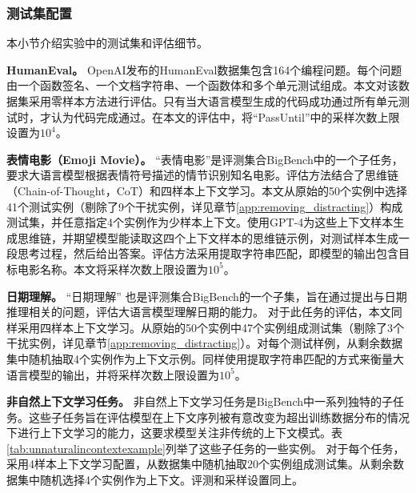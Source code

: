\subsubsection{测试集配置}
\label{app:testset}
本小节介绍实验中的测试集和评估细节。

\textbf{HumanEval。}
\label{app:humaneval}
OpenAI发布的HumanEval\citep{chen2021evaluating}数据集包含164个编程问题。每个问题由一个函数签名、一个文档字符串、一个函数体和多个单元测试组成。本文对该数据集采用零样本方法进行评估。只有当大语言模型生成的代码成功通过所有单元测试时，才认为代码完成通过。在本文的评估中，将“PassUntil”中的采样次数上限设置为\(10^4\)。

\textbf{表情电影（Emoji Movie）。}
\label{app:emoji_movies}
“表情电影”是评测集合BigBench\citep{srivastava2022beyond}中的一个子任务，要求大语言模型根据表情符号描述的情节识别知名电影。评估方法结合了思维链（Chain-of-Thought，CoT）和四样本上下文学习。本文从原始的50个实例中选择41个测试实例（剔除了9个干扰实例，详见章节\ref{app:removing_distracting}）构成测试集，并任意指定4个实例作为少样本上下文。使用GPT-4为这些上下文样本生成思维链，并期望模型能读取这四个上下文样本的思维链示例，对测试样本生成一段思考过程，然后给出答案。评估方法采用提取字符串匹配，即模型的输出包含目标电影名称。本文将采样次数上限设置为\(10^5\)。 

\textbf{日期理解。}
\label{app:dateunderstanding}
“日期理解” 也是评测集合BigBench\citep{srivastava2022beyond}的一个子集，旨在通过提出与日期推理相关的问题，评估大语言模型理解日期的能力。
对于此任务的评估，本文同样采用四样本上下文学习。从原始的50个实例中47个实例组成测试集（剔除了3个干扰实例，详见章节\ref{app:removing_distracting}）。对每个测试样例，从剩余数据集中随机抽取4个实例作为上下文示例。同样使用提取字符串匹配的方式来衡量大语言模型的输出，并将采样次数上限设置为\(10^5\)。

\textbf{非自然上下文学习任务。}
\label{app:unantural_in_context_learning}
非自然上下文学习任务是BigBench\citep{srivastava2022beyond}中一系列独特的子任务。这些子任务旨在评估模型在上下文序列被有意改变为超出训练数据分布的情况下进行上下文学习的能力，这要求模型关注非传统的上下文模式。表\ref{tab:unnaturalincontextexample}列举了这些子任务的一些实例。
对于每个任务，采用4样本上下文学习配置，从数据集中随机抽取20个实例组成测试集。从剩余数据集中随机选择4个实例作为上下文。评测和采样设置同上。

